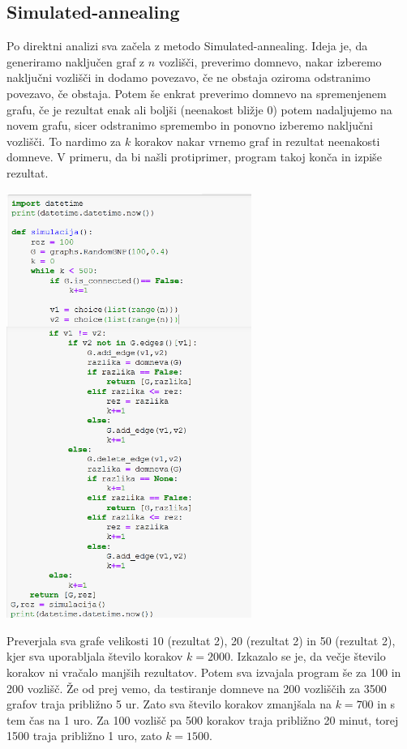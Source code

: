 \documentclass[10pt, a4paper]{article}
\begin{document}
\subsection{Simulated-annealing}
Po direktni analizi sva začela z metodo Simulated-annealing. Ideja je, da generiramo naključen graf z $n$ vozlišči, preverimo domnevo, nakar izberemo naključni vozlišči in dodamo povezavo, če ne obstaja oziroma odstranimo povezavo, če obstaja. Potem še enkrat preverimo domnevo na spremenjenem grafu, če je rezultat enak ali boljši (neenakost bližje 0) potem nadaljujemo na novem grafu, sicer odstranimo spremembo in ponovno izberemo naključni vozlišči. To nardimo za $k$ korakov nakar vrnemo graf in rezultat neenakosti domneve. V primeru, da bi našli protiprimer, program takoj konča in izpiše rezultat.

\begin{center}
\includegraphics[width=8cm]{Simulacija}
\end{center}

Preverjala sva grafe velikosti 10 (rezultat 2), 20 (rezultat 2) in 50 (rezultat 2), kjer sva uporabljala število korakov $k=2000$. Izkazalo se je, da večje število korakov ni vračalo manjših rezultatov. Potem sva izvajala program še za 100 in 200 vozlišč. Že od prej vemo, da testiranje domneve na 200 vozliščih za 3500 grafov traja približno 5 ur. Zato sva število korakov zmanjšala na $k=700$ in s tem čas na 1 uro. Za 100 vozlišč pa 500 korakov traja približno 20 minut, torej 1500 traja približno 1 uro, zato $k=1500$. 
\end{document}
